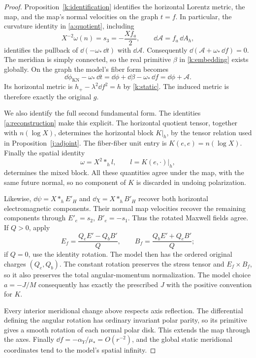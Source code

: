 \begin{proof}
Proposition~\ref{k:identification} identifies the horizontal
Lorentz metric, the map, and the map's normal velocities on the
graph \(t=f\). In particular, the curvature identity in
\eqref{a:quotient}, including
\[
 X^{-2}\omega(n)=s_3=-\frac{Xf_a}{2},
       \qquad \dd\mathcal A=f_a\,\dd A_h,
\]
identifies the pullback of \(\dd(-\omega_*\,\dd t)\) with
\(\dd\mathcal A\). Consequently
\(\dd(\mathcal A+\omega_*\,\dd f)=0\).
The meridian is simply connected, so the real primitive \(\beta\)
in \eqref{k:embedding} exists globally.
On the graph the model's fiber form becomes
\[
 \dd\phi_{\mathrm{KN}}-\omega_*\,\dd t
   =\dd\phi+\dd\beta-\omega_*\,\dd f
   =\dd\phi+\mathcal A.
\]
Its horizontal metric is
\(h_+-\lambda^2\dd f^2=h\) by \eqref{k:static}.
The induced metric is therefore exactly the original \(g\).

We also identify the full second fundamental form.
The identities \eqref{a:reconstruction} make this explicit.
The horizontal quotient tensor, together with \(n(\log X)\),
determines the horizontal block \(K|_h\), by the tensor relation
used in Proposition~\ref{j:adjoint}. The fiber-fiber unit entry is
\(K(e,e)=n(\log X)\). Finally the spatial identity
\[
 \omega=X^2*_h l,\qquad l=K(e,\cdot)|_h,
\]
determines the mixed block. All these quantities agree under the
map, with the same future normal, so no component of \(K\) is
discarded in undoing polarization.

Likewise, \(\dd\psi=X*_hE'_H\) and
\(\dd\chi=X*_hB'_H\) recover both horizontal electromagnetic
components. Their normal map velocities recover the remaining
components through \(E'_e=s_2\), \(B'_e=-s_1\).
Thus the rotated Maxwell fields agree. If \(Q>0\), apply
\begin{equation}\label{k:inverse-duality}
 E_f=\frac{Q_eE'-Q_bB'}Q,\qquad
 B_f=\frac{Q_bE'+Q_eB'}Q;
\end{equation}
if \(Q=0\), use the identity rotation. The model then has the
ordered original charges \((Q_e,Q_b)\).
The constant rotation preserves the stress tensor and
\(E_f\times B_f\), so it also preserves the total angular-momentum
normalization. The model choice \(a=-J/M\) consequently has exactly
the prescribed \(J\) with the positive convention for \(K\).

Every interior meridional change above respects axis reflection.
The differential defining the angular rotation has ordinary
invariant polar parity, so its primitive gives a smooth rotation
of each normal polar disk. This extends the map through the axes.
Finally \(\dd f=-\alpha_Y/\mu_*=O(r^{-2})\), and the global static
meridional coordinates tend to the model's spatial infinity.
\end{proof}

